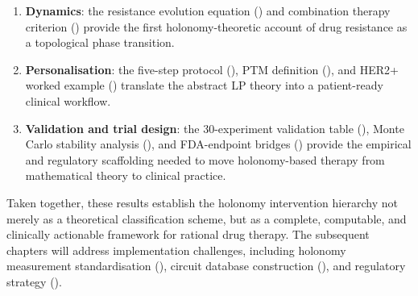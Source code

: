 \begin{enumerate}
  \item \textbf{Dynamics}: the resistance evolution equation
        () and combination therapy criterion
        () provide the first
        holonomy-theoretic account of drug resistance as a topological phase
        transition.
  \item \textbf{Personalisation}: the five-step protocol
        (), PTM definition (), and
        HER2+ worked example () translate the
        abstract LP theory into a patient-ready clinical workflow.
  \item \textbf{Validation and trial design}: the 30-experiment validation
        table (), Monte Carlo stability analysis
        (), and FDA-endpoint bridges
        () provide the empirical and regulatory
        scaffolding needed to move holonomy-based therapy from mathematical
        theory to clinical practice.
\end{enumerate}

Taken together, these results establish the holonomy intervention hierarchy not
merely as a theoretical classification scheme, but as a complete, computable,
and clinically actionable framework for rational drug therapy.  The subsequent
chapters will address implementation challenges, including holonomy measurement
standardisation (), circuit database construction
(), and regulatory strategy ().


